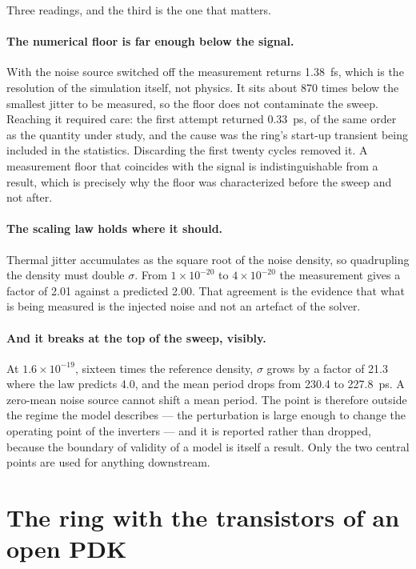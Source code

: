 Three readings, and the third is the one that matters.

\paragraph{The numerical floor is far enough below the signal.} With the
noise source switched off the measurement returns 1.38~fs, which is the
resolution of the simulation itself, not physics. It sits about 870 times
below the smallest jitter to be measured, so the floor does not
contaminate the sweep. Reaching it required care: the first attempt
returned 0.33~ps, of the same order as the quantity under study, and the
cause was the ring's start-up transient being included in the statistics.
Discarding the first twenty cycles removed it. A measurement floor that
coincides with the signal is indistinguishable from a result, which is
precisely why the floor was characterized before the sweep and not after.

\paragraph{The scaling law holds where it should.} Thermal jitter
accumulates as the square root of the noise density, so quadrupling the
density must double $\sigma$. From $1\times10^{-20}$ to
$4\times10^{-20}$ the measurement gives a factor of 2.01 against a
predicted 2.00. That agreement is the evidence that what is being measured
is the injected noise and not an artefact of the solver.

\paragraph{And it breaks at the top of the sweep, visibly.} At
$1.6\times10^{-19}$, sixteen times the reference density, $\sigma$ grows by
a factor of 21.3 where the law predicts 4.0, and the mean period drops from
230.4 to 227.8~ps. A zero-mean noise source cannot shift a mean period.
The point is therefore outside the regime the model describes --- the
perturbation is large enough to change the operating point of the
inverters --- and it is reported rather than dropped, because the boundary
of validity of a model is itself a result. Only the two central points are
used for anything downstream.

\section{The ring with the transistors of an open PDK}
\label{sec:ihp_ring}

